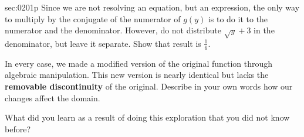\begin{multicols*}{2}
\begin{exercises}{sec:0201p}
\vspace{1cm}
\lab[0201Lab9]Since we are not resolving an equation, but an expression, the only way to multiply by the 
conjugate of the numerator of $g(y)$ is to do it to the numerator and the denominator.  However,
do not distribute $\sqrt{y}+3$ in the denominator, but leave it separate.  Show that result is
$\frac{1}{6}$.

\vspace{2cm}
\lab[0201LabA]  In every case, we made a modified version of the original function through 
algebraic manipulation.  This new version is nearly identical but lacks the 
\textbf{removable discontinuity} of the original. Describe in your own words how our 
changes affect the domain.

\vspace{3cm}
\lab[0201LabB] What did you learn as a result of doing this exploration that you did not know before?

\end{exercises}
\end{multicols*}